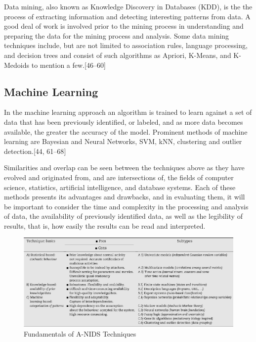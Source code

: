 \documentclass[11pt,]{article}
\begin{document}
Data mining, also known as Knowledge Discovery in Databases (KDD), is
the the process of extracting information and detecting interesting
patterns from data. A good deal of work is involved prior to the mining
process in understanding and preparing the data for the mining process
and analysis. Some data mining techniques include, but are not limited
to association rules, language processing, and decision trees and
consist of such algorithms as Apriori, K-Means, and K-Medoids to mention
a few.{[}46--60{]}

\subsection{Machine Learning}\label{machine-learning}

In the machine learning approach an algorithm is trained to learn
against a set of data that has been previously identified, or labeled,
and as more data becomes available, the greater the accuracy of the
model. Prominent methods of machine learning are Bayesian and Neural
Networks, SVM, kNN, clustering and outlier detection.{[}44, 61--68{]}

Similarities and overlap can be seen between the techniques above as
they have evolved and originated from, and are intersections of, the
fields of computer science, statistics, artificial intelligence, and
database systems. Each of these methods presents its advantages and
drawbacks, and in evaluating them, it will be important to consider the
time and complexity in the processing and analysis of data, the
availability of previously identified data, as well as the legibility of
results, that is, how easily the results can be read and interpreted.

\begin{figure}

{\centering \includegraphics{thesis_files/figure-latex/unnamed-chunk-11-1} 

}

\caption{Fundamentals of A-NIDS Techniques}\label{fig:unnamed-chunk-11}
\end{figure}
\end{document}
